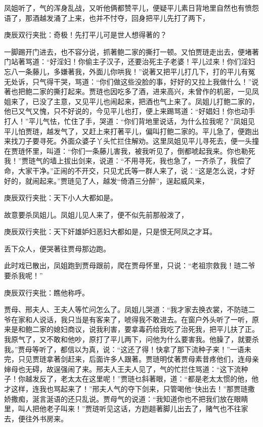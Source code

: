 \begin{parag}
    凤姐听了，气的浑身乱战，又听他俩都赞平儿，便疑平儿素日背地里自然也有愤怨语了，那酒越发涌了上来，也并不忖夺，回身把平儿先打了两下，\begin{note}庚辰双行夹批：奇极！先打平儿可是世人想得著的？\end{note}一脚踢开门进去，也不容分说，抓著鲍二家的撕打一顿。又怕贾琏走出去，便堵著门站著骂道：“好淫妇！你偷主子汉子，还要治死主子老婆！平儿过来！你们淫妇忘八一条藤儿，多嫌著我，外面儿你哄我！”说著又把平儿打几下，打的平儿有冤无处诉，只气得干哭，骂道：“你们做这些没脸的事，好好的又拉上我做什么！”说著也把鲍二家的撕打起来。贾琏也因吃多了酒，进来高兴，未曾作的机密，一见凤姐来了，已没了主意，又见平儿也闹起来，把酒也气上来了。凤姐儿打鲍二家的，他已又气又愧，只不好说的，今见平儿也打，便上来踢骂道：“好娼妇！你也动手打人！”平儿气怯，忙住了手，哭道：“你们背地里说话，为什么拉我呢？”凤姐见平儿怕贾琏，越发气了，又赶上来打著平儿，偏叫打鲍二家的。平儿急了，便跑出来找刀子要寻死。外面众婆子丫头忙拦住解劝。这里凤姐见平儿寻死去，便一头撞在贾琏怀里，叫道：“你们一条藤儿害我，被我听见了，倒都唬起我来。你也勒死我！”贾琏气的墙上拔出剑来，说道：“不用寻死，我也急了，一齐杀了，我偿了命，大家干净。”正闹的不开交，只见尤氏等一群人来了，说：“这是怎么说，才好好的，就闹起来。”贾琏见了人，越发“倚酒三分醉”，逞起威风来，\begin{note}庚辰双行夹批：天下小人大都如是。\end{note}故意要杀凤姐儿。凤姐儿见人来了，便不似先前那般泼了，\begin{note}庚辰双行夹批：天下奸雄妒妇恶妇大都如是，只是恨无阿凤之才耳。\end{note}丢下众人，便哭著往贾母那边跑。
\end{parag}


\begin{parag}
    此时戏已散出，凤姐跑到贾母跟前，爬在贾母怀里，只说：“老祖宗救我！琏二爷要杀我呢！”\begin{note}庚辰双行夹批：瞧他称呼。\end{note}贾母、邢夫人、王夫人等忙问怎么了。凤姐儿哭道：“我才家去换衣裳，不防琏二爷在家和人说话，我只当是有客来了，唬得我不敢进去。在窗户外头听了一听，原来是和鲍二家的媳妇商议，说我利害，要拿毒药给我吃了治死我，把平儿扶了正。我原气了，又不敢和他吵，原打了平儿两下，问他为什么要害我。他臊了，就要杀我。”贾母等听了，都信以为真，说：“这还了得！快拿了那下流种子来！”一语未完，只见贾琏拿著剑赶来，后面许多人跟著。贾琏明仗著贾母素昔疼他们，连母亲婶母也无碍，故逞强闹了来。邢夫人王夫人见了，气的忙拦住骂道：“这下流种子！你越发反了，老太太在这里呢！”贾琏乜斜著眼，道：“都是老太太惯的他，他才这样，连我也骂起来了！”邢夫人气的夺下剑来，只管喝他“快出去！”那贾琏撒娇撒痴，涎言涎语的还只乱说。贾母气的说道：“我知道你也不把我们放在眼睛里，叫人把他老子叫来！”贾琏听见这话，方趔趄著脚儿出去了，赌气也不往家去，便往外书房来。
\end{parag}


